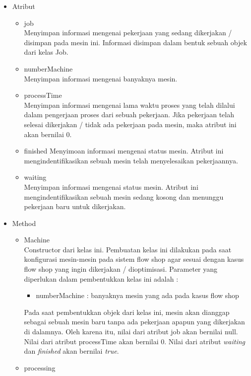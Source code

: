 \begin{itemize}
		\begin{itemize}
			\item Atribut
			\begin{itemize}
				\item job \\
				Menyimpan informasi mengenai pekerjaan yang sedang dikerjakan / disimpan pada
				mesin ini. Informasi disimpan dalam bentuk sebuah objek dari kelas Job.
				\item numberMachine \\
				Menyimpan informasi mengenai banyaknya mesin.
				\item processTime \\
				Menyimpan informasi mengenai lama waktu proses yang telah dilalui dalam pengerjaan
				proses dari sebuah pekerjaan. Jika pekerjaan telah selesai dikerjakan / tidak
				ada pekerjaan pada mesin, maka atribut ini akan bernilai 0.
				\item finished
				Menyimoan informasi mengenai status mesin. 
				Atribut ini mengindentifikasikan sebuah mesin telah menyelesaikan pekerjaannya.
				\item waiting \\
				Menyimpan informasi mengenai status mesin. Atribut ini mengindentifikasikan sebuah
				mesin sedang kosong dan menunggu pekerjaan baru untuk dikerjakan.
			\end{itemize}
			\item Method
			\begin{itemize}
				\item Machine \\
				Constructor dari kelas ini. Pembuatan kelas ini dilakukan pada saat konfigurasi
				mesin-mesin pada sistem flow shop agar sesuai dengan kasus flow shop yang ingin dikerjakan / dioptimisasi.
				Parameter yang diperlukan dalam pembentukkan kelas ini adalah :
				\begin{itemize}
					\item numberMachine : banyaknya mesin yang ada pada kasus flow shop
				\end{itemize}
				Pada saat pembentukkan objek dari kelas ini, mesin akan dianggap sebagai sebuah
				mesin baru tanpa ada pekerjaan apapun yang dikerjakan di dalamnya. Oleh karena
				itu, nilai dari atribut job akan bernilai null. Nilai dari atribut processTime akan
				bernilai 0. Nilai dari atribut \textit{waiting} dan \textit{finished} akan bernilai \textit{true}.
				\item processing \\

\end{itemize}
\end{itemize}
\end{itemize}
